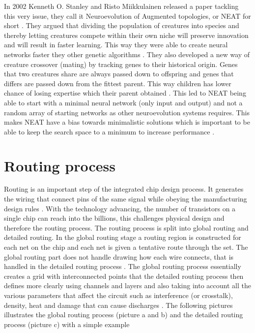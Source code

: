 \documentclass{kththesis}
\begin{document}
In 2002 Kenneth O. Stanley and Risto Miikkulainen released a paper tackling this very issue, they call it Neuroevolution of Augmented topologies, or NEAT for short \parencite{NEAT}. They argued that dividing the population of creatures into species and thereby letting creatures compete within their own niche will preserve innovation and will result in faster learning. This way they were able to create neural networks faster they other genetic algorithms \parencite{NEAT115}. They also developed a new way of creature crossover (mating) by tracking genes to their historical origin. Genes that two creatures share are always passed down to offspring and genes that differs are passed down from the fittest parent. This way children has lower chance of losing expertise which their parent obtained \parencite{NEAT108}. This led to NEAT being able to start with a minimal neural network (only input and output) and not a random array of starting networks as other neuroevolution systems requires. This makes NEAT have a bias towards minimalistic solutions which is important to be able to keep the search space to a minimum to increase performance \parencite{NEAT111}.
 
 
\section{Routing process}
Routing is an important step of the integrated chip design process. It generates the wiring that connect pins of the same signal while obeying the manufacturing design rules \parencite{EDA_routing}. With the technology advancing, the number of transistors on a single chip can reach into the billions, this challenges physical design and therefore the routing process.
The routing process is split into global routing and detailed routing. In the global routing stage a routing region is constructed for each net on the chip and each net is given a tentative route through the set. The global routing part does not handle drawing how each wire connects, that is handled in the detailed routing process \parencite{routing11}. The global routing process essentially creates a grid with interconnected points that the detailed routing process then defines more clearly using channels and layers and also taking into account all the various parameters that affect the circuit such as interference (or crosstalk), density, heat and damage that can cause discharges \parencite{EDA_routing}. The following pictures illustrates the global routing process (picture a and b) and the detailed routing process (picture c) with a simple example
 
\end{document}
